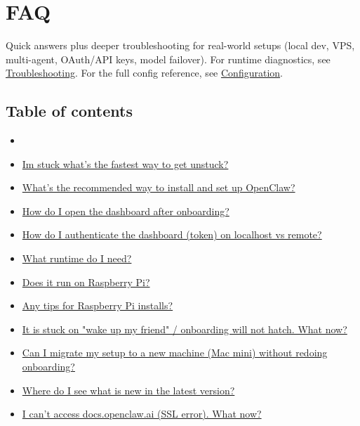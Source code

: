 \clearpage

\section{FAQ}


Quick answers plus deeper troubleshooting for real-world setups (local dev, VPS, multi-agent, OAuth/API keys, model failover). For runtime diagnostics, see \href{/gateway/troubleshooting}{Troubleshooting}. For the full config reference, see \href{/gateway/configuration}{Configuration}.

\subsection{Table of contents}


\begin{itemize}
  \item [Quick start and first-run setup]
  \item \href{\#im-stuck-whats-the-fastest-way-to-get-unstuck}{Im stuck what's the fastest way to get unstuck?}
  \item \href{\#whats-the-recommended-way-to-install-and-set-up-openclaw}{What's the recommended way to install and set up OpenClaw?}
  \item \href{\#how-do-i-open-the-dashboard-after-onboarding}{How do I open the dashboard after onboarding?}
  \item \href{\#how-do-i-authenticate-the-dashboard-token-on-localhost-vs-remote}{How do I authenticate the dashboard (token) on localhost vs remote?}
  \item \href{\#what-runtime-do-i-need}{What runtime do I need?}
  \item \href{\#does-it-run-on-raspberry-pi}{Does it run on Raspberry Pi?}
  \item \href{\#any-tips-for-raspberry-pi-installs}{Any tips for Raspberry Pi installs?}
  \item \href{\#it-is-stuck-on-wake-up-my-friend-onboarding-will-not-hatch-what-now}{It is stuck on "wake up my friend" / onboarding will not hatch. What now?}
  \item \href{\#can-i-migrate-my-setup-to-a-new-machine-mac-mini-without-redoing-onboarding}{Can I migrate my setup to a new machine (Mac mini) without redoing onboarding?}
  \item \href{\#where-do-i-see-what-is-new-in-the-latest-version}{Where do I see what is new in the latest version?}
  \item \href{\#i-cant-access-docsopenclawai-ssl-error-what-now}{I can't access docs.openclaw.ai (SSL error). What now?}

\end{itemize}
